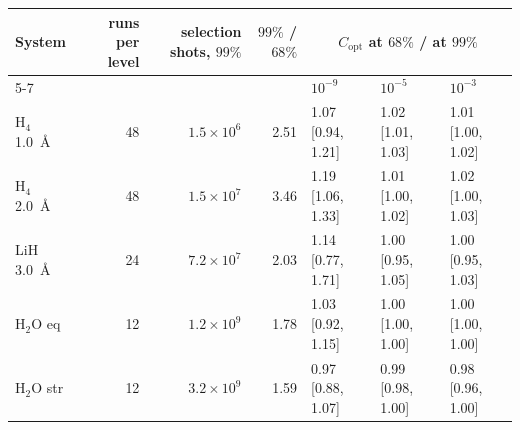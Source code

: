 \begin{tabular}{@{}lrrrlll@{}}
\toprule
System & runs per level & selection shots, $99\%$ & $99\%$ / $68\%$ & \multicolumn{3}{c}{$C_{\mathrm{opt}}$ at $68\%$ / at $99\%$} \\
\cmidrule(lr){5-7}
 & & & & $10^{-9}$ & $10^{-5}$ & $10^{-3}$ \\
\midrule
H$_4$ 1.0~\AA & 48 & $1.5\times10^{6}$ & 2.51 & 1.07 [0.94, 1.21] & 1.02 [1.01, 1.03] & 1.01 [1.00, 1.02] \\
H$_4$ 2.0~\AA & 48 & $1.5\times10^{7}$ & 3.46 & 1.19 [1.06, 1.33] & 1.01 [1.00, 1.02] & 1.02 [1.00, 1.03] \\
LiH 3.0~\AA & 24 & $7.2\times10^{7}$ & 2.03 & 1.14 [0.77, 1.71] & 1.00 [0.95, 1.05] & 1.00 [0.95, 1.03] \\
H$_2$O eq & 12 & $1.2\times10^{9}$ & 1.78 & 1.03 [0.92, 1.15] & 1.00 [1.00, 1.00] & 1.00 [1.00, 1.00] \\
H$_2$O str & 12 & $3.2\times10^{9}$ & 1.59 & 0.97 [0.88, 1.07] & 0.99 [0.98, 1.00] & 0.98 [0.96, 1.00] \\
\bottomrule
\end{tabular}
